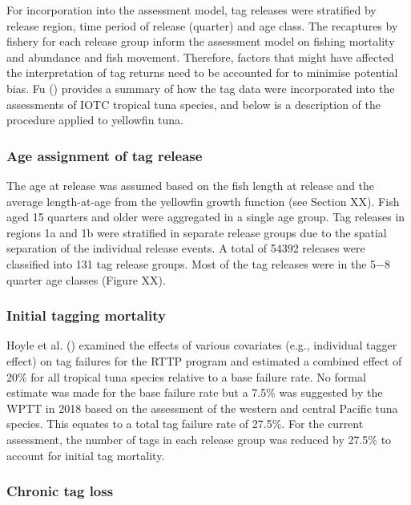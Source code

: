 \documentclass[
]{scrartcl}
\begin{document}
For incorporation into the assessment model, tag releases were
stratified by release region, time period of release (quarter) and age
class. The recaptures by fishery for each release group inform the
assessment model on fishing mortality and abundance and fish movement.
Therefore, factors that might have affected the interpretation of tag
returns need to be accounted for to minimise potential bias. Fu
() provides a summary of how
the tag data were incorporated into the assessments of IOTC tropical
tuna species, and below is a description of the procedure applied to
yellowfin tuna.

\subsubsection{Age assignment of tag
release}\label{age-assignment-of-tag-release}

The age at release was assumed based on the fish length at release and
the average length-at-age from the yellowfin growth function (see
Section XX). Fish aged 15 quarters and older were aggregated in a single
age group. Tag releases in regions 1a and 1b were stratified in separate
release groups due to the spatial separation of the individual release
events. A total of 54392 releases were classified into 131 tag release
groups. Most of the tag releases were in the 5−8 quarter age classes
(Figure XX).

\subsubsection{Initial tagging
mortality}\label{initial-tagging-mortality}

Hoyle et al. ()
examined the effects of various covariates (e.g., individual tagger
effect) on tag failures for the RTTP program and estimated a combined
effect of 20\% for all tropical tuna species relative to a base failure
rate. No formal estimate was made for the base failure rate but a 7.5\%
was suggested by the WPTT in 2018 based on the assessment of the western
and central Pacific tuna species. This equates to a total tag failure
rate of 27.5\%. For the current assessment, the number of tags in each
release group was reduced by 27.5\% to account for initial tag
mortality.

\subsubsection{Chronic tag loss}\label{chronic-tag-loss}
\end{document}
